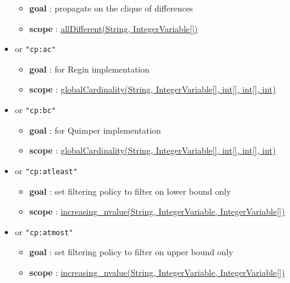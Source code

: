 \begin{itemize}
\begin{itemize}
				\item \textbf{goal} : propagate on the clique of differences
				\item \textbf{scope} : \hyperlink{alldifferent:alldifferentconstraint}{allDifferent(String, IntegerVariable[])}
		\end{itemize}
		\item \label{cgccac:cgccacoptions}\hypertarget{cgccac:cgccacoptions}{}
		 or \texttt{"cp:ac"}
		\begin{itemize}
				\item \textbf{goal} : for Regin implementation
				\item \textbf{scope} : \hyperlink{globalcardinality:globalcardinalityconstraint}{globalCardinality(String, IntegerVariable[], int[], int[], int)}
		\end{itemize}
		\item \label{cgccbc:cgccbcoptions}\hypertarget{cgccbc:cgccbcoptions}{}
		 or \texttt{"cp:bc"}
		\begin{itemize}
				\item \textbf{goal} : for Quimper implementation
				\item \textbf{scope} : \hyperlink{globalcardinality:globalcardinalityconstraint}{globalCardinality(String, IntegerVariable[], int[], int[], int)}
		\end{itemize}
		\item \label{cinvatleast:cinvatleastoptions}\hypertarget{cinvatleast:cinvatleastoptions}{}
		 or \texttt{"cp:atleast"}
		\begin{itemize}
				\item \textbf{goal} : set filtering policy to filter on lower bound only
				\item \textbf{scope} : \hyperlink{increasingnvalue:increasingnvalueconstraint}{increasing\_nvalue(String, IntegerVariable, IntegerVariable[])}
		\end{itemize}
		\item \label{cinvatmost:cinvatmostoptions}\hypertarget{cinvatmost:cinvatmostoptions}{}
		 or \texttt{"cp:atmost"}
		\begin{itemize}
				\item \textbf{goal} : set filtering policy to filter on upper bound only
				\item \textbf{scope} : \hyperlink{increasingnvalue:increasingnvalueconstraint}{increasing\_nvalue(String, IntegerVariable, IntegerVariable[])}

\end{itemize}
\end{itemize}
